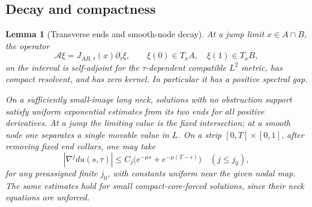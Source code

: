 \documentclass[11pt]{article}
\newtheorem{lemma}[theorem]{Lemma}
\theoremstyle{definition}
\theoremstyle{remark}
\numberwithin{equation}{section}
\begin{document}
\subsection{Decay and compactness}

\begin{lemma}[Transverse ends and smooth-node decay]\label{local:decay}
At a jump limit $x\in A\cap B$, the operator
\[
 \mathcal A\xi=J_{AB,\tau}(x)\partial_\tau\xi,\qquad
 \xi(0)\in T_xA,\quad\xi(1)\in T_xB,
\]
on the interval is self-adjoint for the $\tau$-dependent compatible
$L^2$ metric, has compact resolvent, and has zero kernel.  In particular
it has a positive spectral gap.

On a sufficiently small-image long neck, solutions with no obstruction
support satisfy uniform exponential estimates from its two ends for
all positive derivatives.  At a jump the limiting value is the fixed
intersection; at a smooth node one separates a single movable value in
$L$.  On a strip $[0,T]\times[0,1]$, after removing fixed end collars,
one may take
\begin{equation}\label{local:two-sided-decay}
 |\nabla^jdu(s,\tau)|\leq C_j\bigl(e^{-\mu s}+e^{-\mu(T-s)}\bigr)
 \quad (j\leq j_0),
\end{equation}
for any preassigned finite $j_0$, with constants uniform near the given
nodal map.  The same estimates hold for small compact-core-forced
solutions, since their neck equations are unforced.
\end{lemma}
\end{document}
